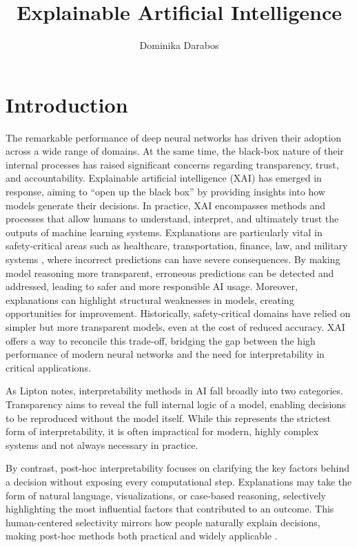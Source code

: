 \documentclass{article}
\title{Explainable Artificial Intelligence}
\author{Dominika Darabos}
\begin{document}
\maketitle

\section*{Introduction}

The remarkable performance of deep neural networks has driven their adoption across a wide range of domains. At the same time, the black-box nature of their internal processes has raised significant concerns regarding transparency, trust, and accountability. Explainable artificial intelligence (XAI) has emerged in response, aiming to “open up the black box” by providing insights into how models generate their decisions. In practice, XAI encompasses methods and processes that allow humans to understand, interpret, and ultimately trust the outputs of machine learning systems. Explanations are particularly vital in safety-critical areas such as healthcare, transportation, finance, law, and military systems \cite{Peeking_inside_the_black_box}, where incorrect predictions can have severe consequences. By making model reasoning more transparent, erroneous predictions can be detected and addressed, leading to safer and more responsible AI usage. Moreover, explanations can highlight structural weaknesses in models, creating opportunities for improvement. Historically, safety-critical domains have relied on simpler but more transparent models, even at the cost of reduced accuracy. XAI offers a way to reconcile this trade-off, bridging the gap between the high performance of modern neural networks and the need for interpretability in critical applications.

As Lipton \cite{lipton_mythos_2018} notes, interpretability methods in AI fall broadly into two categories. Transparency aims to reveal the full internal logic of a model, enabling decisions to be reproduced without the model itself. While this represents the strictest form of interpretability, it is often impractical for modern, highly complex systems and not always necessary in practice.

By contrast, post-hoc interpretability focuses on clarifying the key factors behind a decision without exposing every computational step. Explanations may take the form of natural language, visualizations, or case-based reasoning, selectively highlighting the most influential factors that contributed to an outcome. This human-centered selectivity mirrors how people naturally explain decisions, making post-hoc methods both practical and widely applicable \cite{miller2017explanation}.
\end{document}
